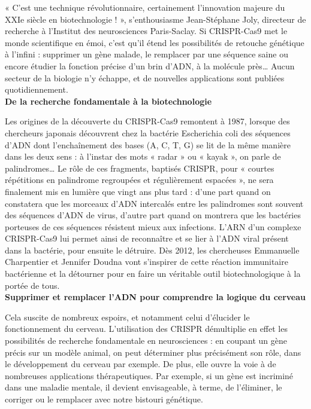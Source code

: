 \documentclass[8pt]{article}
\begin{document}
« C’est une technique révolutionnaire, certainement l’innovation majeure du XXIe siècle en biotechnologie ! », s’enthousiasme Jean-Stéphane Joly, directeur de recherche à l’Institut des neurosciences Paris-Saclay. Si CRISPR-Cas9 met le monde scientifique en émoi, c’est qu’il étend les possibilités de retouche génétique à l’infini : supprimer un gène malade, le remplacer par une séquence saine ou encore étudier la fonction précise d’un brin d’ADN, à la molécule près… Aucun secteur de la biologie n’y échappe, et de nouvelles applications sont publiées quotidiennement.  \\

\textbf{De la recherche fondamentale à la biotechnologie}

Les origines de la découverte du CRISPR-Cas9 remontent à 1987, lorsque des chercheurs japonais découvrent chez la bactérie Escherichia coli des séquences d’ADN dont l’enchaînement des bases (A, C, T, G) se lit de la même manière dans les deux sens : à l’instar des mots « radar » ou « kayak », on parle de palindromes… Le rôle de ces fragments, baptisés CRISPR, pour « courtes répétitions en palindrome regroupées et régulièrement espacées », ne sera finalement mis en lumière que vingt ans plus tard : d’une part quand on constatera que les morceaux d’ADN intercalés entre les palindromes sont souvent des séquences d’ADN de virus, d’autre part quand on montrera que les bactéries porteuses de ces séquences résistent mieux aux infections. L’ARN d’un complexe CRISPR-Cas9 lui permet ainsi de reconnaître et se lier à l’ADN viral présent dans la bactérie, pour ensuite le détruire.  Dès 2012, les chercheuses Emmanuelle Charpentier et Jennifer Doudna vont s’inspirer de cette réaction immunitaire bactérienne et la détourner pour en faire un véritable outil biotechnologique à la portée de tous.  \\

\textbf{Supprimer et remplacer l’ADN pour comprendre la logique du cerveau}

Cela suscite de nombreux espoirs, et notamment celui d’élucider le fonctionnement du cerveau. L’utilisation des CRISPR démultiplie en effet les possibilités de recherche fondamentale en neurosciences : en coupant un gène précis sur un modèle animal, on peut déterminer plus précisément son rôle, dans le développement du cerveau par exemple. De plus, elle ouvre la voie à de nombreuses applications thérapeutiques. Par exemple, si un gène est incriminé dans une maladie mentale, il devient envisageable, à terme, de l’éliminer, le corriger ou le remplacer avec notre bistouri génétique.  \\
\end{document}
